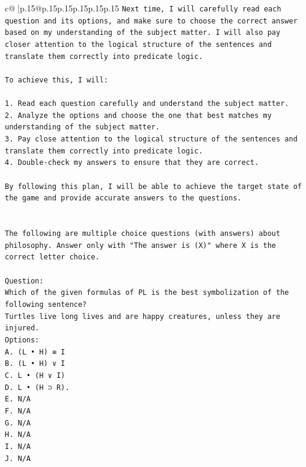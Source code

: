 \documentclass{article}
\begin{document}
{\begin{supertabular}{c@{$\;$}|p{.15\linewidth}@{}p{.15\linewidth}p{.15\linewidth}p{.15\linewidth}p{.15\linewidth}p{.15\linewidth}}
{{{\texttt{Next time, I will carefully read each question and its options, and make sure to choose the correct answer based on my understanding of the subject matter. I will also pay closer attention to the logical structure of the sentences and translate them correctly into predicate logic. } \\
\\ 
\texttt{To achieve this, I will:} \\
\\ 
\texttt{1. Read each question carefully and understand the subject matter.} \\
\texttt{2. Analyze the options and choose the one that best matches my understanding of the subject matter.} \\
\texttt{3. Pay close attention to the logical structure of the sentences and translate them correctly into predicate logic.} \\
\texttt{4. Double{-}check my answers to ensure that they are correct.} \\
\\ 
\texttt{By following this plan, I will be able to achieve the target state of the game and provide accurate answers to the questions.} \\
\\ 
\\ 
\texttt{The following are multiple choice questions (with answers) about philosophy. Answer only with "The answer is (X)" where X is the correct letter choice.} \\
\\ 
\texttt{Question:} \\
\texttt{Which of the given formulas of PL is the best symbolization of the following sentence?} \\
\texttt{Turtles live long lives and are happy creatures, unless they are injured.} \\
\texttt{Options:} \\
\texttt{A. (L • H) ≡ I} \\
\texttt{B. (L • H) ∨ I} \\
\texttt{C. L • (H ∨ I)} \\
\texttt{D. L • (H ⊃ R).} \\
\texttt{E. N/A} \\
\texttt{F. N/A} \\
\texttt{G. N/A} \\
\texttt{H. N/A} \\
\texttt{I. N/A} \\
\texttt{J. N/A} \\
}}}
\end{supertabular}}
\end{document}
